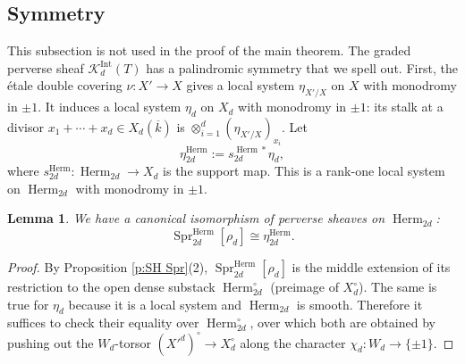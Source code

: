 \documentclass[reqno]{amsart}
\numberwithin{equation}{section}
\newcommand{\Q}{\mathbf{Q}}
\newcommand{\ol}[1]{\overline{#1}}
\DeclareMathOperator{\Frob}{Fr}
\DeclareMathOperator{\Tr}{Tr}
\DeclareMathOperator{\Herm}{Herm}
\DeclareMathOperator{\Spr}{Spr}
\DeclareMathOperator{\Int}{Int}
\newcommand{\ov}{\overline}
\newcommand\ot{\otimes}
\renewcommand\c{\circ}
\newcommand{\y}{\eta}
\renewcommand{\r}{\rho}
\newcommand\cA{\mathcal{A}}
\newcommand\cE{\mathcal{E}}
\newcommand\cH{\mathcal{H}}
\newcommand\cK{\mathcal{K}}
\newcommand\cQ{\mathcal{Q}}
\newcommand\cZ{\mathcal{Z}}
\newtheorem{lemma}[thm]{Lemma}
\theoremstyle{remark}
\numberwithin{equation}{section}
\begin{document}


\subsection{Symmetry} This subsection is not used in the proof of the main theorem. The graded perverse sheaf $\cK^{\Int}_{d}(T)$ has a palindromic symmetry that we spell out. First, the \'etale double covering $\nu:X'\to X$ gives a local system $\y_{X'/X}$ on $X$ with monodromy in $\pm1$.  It induces a local system $\y_{d}$ on $X_{d}$ with monodromy in $\pm1$: its stalk at a divisor $x_{1}+\cdots+x_{d}\in X_{d}(\ov{k})$ is $\ot_{i=1}^{d}(\y_{X'/X})_{x_{i}}$. Let 
\begin{equation}
\y^{\Herm}_{2d}:=s^{\Herm*}_{2d}\y_{d},
\end{equation}
where $s^{\Herm}_{2d}: \Herm_{2d}\to X_{d}$ is the support map. This is a rank-one local system on $\Herm_{2d}$ with monodromy in $\pm1$.

\begin{lemma} We have a canonical isomorphism of perverse sheaves on $\Herm_{2d}$:
\begin{equation}
\Spr^{\Herm}_{2d}[\r_{d}]\cong\y^{\Herm}_{2d}.
\end{equation}
\end{lemma}
\begin{proof}
By Proposition \ref{p:SH Spr}(2), $\Spr^{\Herm}_{2d}[\r_{d}]$ is the middle extension of its restriction to the open dense substack $\Herm_{2d}^{\c}$ (preimage of $X^{\c}_{d}$). The same is true for $\y_{d}$  because it is a local system and $\Herm_{2d}$ is smooth. Therefore it suffices to check their equality over $\Herm_{2d}^{\c}$, over which both are obtained by pushing out the $W_{d}$-torsor $(X'^{d})^{\c}\to X_{d}^{\c}$ along the character $\chi_{d}: W_{d}\to \{\pm1\}$.
\end{proof}
\end{document}
